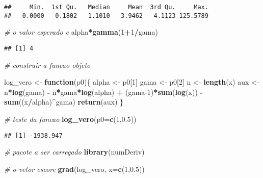 \documentclass[
]{article}
\newenvironment{Shaded}{\begin{snugshade}}{\end{snugshade}}
\newcommand{\AttributeTok}[1]{\textcolor[rgb]{0.13,0.29,0.53}{#1}}
\newcommand{\CommentTok}[1]{\textcolor[rgb]{0.56,0.35,0.01}{\textit{#1}}}
\newcommand{\ControlFlowTok}[1]{\textcolor[rgb]{0.13,0.29,0.53}{\textbf{#1}}}
\newcommand{\DecValTok}[1]{\textcolor[rgb]{0.00,0.00,0.81}{#1}}
\newcommand{\FloatTok}[1]{\textcolor[rgb]{0.00,0.00,0.81}{#1}}
\newcommand{\FunctionTok}[1]{\textcolor[rgb]{0.13,0.29,0.53}{\textbf{#1}}}
\newcommand{\NormalTok}[1]{#1}
\newcommand{\OtherTok}[1]{\textcolor[rgb]{0.56,0.35,0.01}{#1}}
\newcommand{\SpecialCharTok}[1]{\textcolor[rgb]{0.81,0.36,0.00}{\textbf{#1}}}
\begin{document}
\begin{verbatim}
##     Min.  1st Qu.   Median     Mean  3rd Qu.     Max. 
##   0.0000   0.1802   1.1010   3.9462   4.1123 125.5789
\end{verbatim}

\begin{Shaded}
\begin{Highlighting}[]
\CommentTok{\# o valor esperado e}
\NormalTok{alpha}\SpecialCharTok{*}\FunctionTok{gamma}\NormalTok{(}\DecValTok{1}\SpecialCharTok{+}\DecValTok{1}\SpecialCharTok{/}\NormalTok{gama)}
\end{Highlighting}
\end{Shaded}

\begin{verbatim}
## [1] 4
\end{verbatim}

\begin{Shaded}
\begin{Highlighting}[]
\CommentTok{\# construir a funcao objeto }

\NormalTok{log\_vero }\OtherTok{\textless{}{-}} \ControlFlowTok{function}\NormalTok{(p0)\{}
\NormalTok{  alpha }\OtherTok{\textless{}{-}}\NormalTok{ p0[}\DecValTok{1}\NormalTok{]}
\NormalTok{  gama }\OtherTok{\textless{}{-}}\NormalTok{ p0[}\DecValTok{2}\NormalTok{]}
\NormalTok{  n }\OtherTok{\textless{}{-}} \FunctionTok{length}\NormalTok{(x)}
\NormalTok{  aux }\OtherTok{\textless{}{-}}\NormalTok{ n}\SpecialCharTok{*}\FunctionTok{log}\NormalTok{(gama) }\SpecialCharTok{{-}}\NormalTok{ n}\SpecialCharTok{*}\NormalTok{gama}\SpecialCharTok{*}\FunctionTok{log}\NormalTok{(alpha) }\SpecialCharTok{+}\NormalTok{ (gama}\DecValTok{{-}1}\NormalTok{)}\SpecialCharTok{*}\FunctionTok{sum}\NormalTok{(}\FunctionTok{log}\NormalTok{(x)) }\SpecialCharTok{{-}} \FunctionTok{sum}\NormalTok{((x}\SpecialCharTok{/}\NormalTok{alpha)}\SpecialCharTok{\^{}}\NormalTok{gama)}
  \FunctionTok{return}\NormalTok{(aux)}
\NormalTok{\}}

\CommentTok{\# teste da funcao }
\FunctionTok{log\_vero}\NormalTok{(}\AttributeTok{p0=}\FunctionTok{c}\NormalTok{(}\DecValTok{1}\NormalTok{,}\FloatTok{0.5}\NormalTok{))}
\end{Highlighting}
\end{Shaded}

\begin{verbatim}
## [1] -1938.947
\end{verbatim}

\begin{Shaded}
\begin{Highlighting}[]
\CommentTok{\# pacote a ser carregado}
\FunctionTok{library}\NormalTok{(numDeriv)}

\CommentTok{\# o vetor escore }
\FunctionTok{grad}\NormalTok{(log\_vero, }\AttributeTok{x=}\FunctionTok{c}\NormalTok{(}\DecValTok{1}\NormalTok{,}\FloatTok{0.5}\NormalTok{))}
\end{Highlighting}
\end{Shaded}
\end{document}
